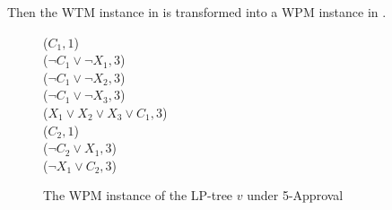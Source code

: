 Then the WTM instance in  is transformed into
a WPM instance in .
\begin{figure}[H]
   \small
	\begin{framed}
		($C_1,1$)\\
		($\neg C_1 \vee \neg X_1, 3$)\\
		($\neg C_1 \vee \neg X_2, 3$)\\
		($\neg C_1 \vee \neg X_3, 3$)\\
		($X_1 \vee X_2 \vee X_3 \vee C_1, 3$)\\
		($C_2, 1$)\\
		($\neg C_2 \vee X_1, 3$)\\
		($\neg X_1 \vee C_2, 3$)
	\end{framed}
	\caption{The WPM instance of the LP-tree $v$ under 5-Approval}
  \label{fig:app_wpm}
\end{figure}


